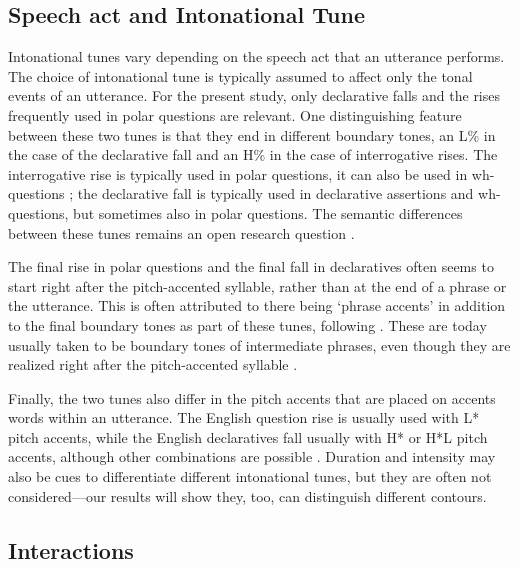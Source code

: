 \documentclass[preprint,review,12pt,authoryear,times]{elsarticle}
\begin{document}
\subsection{Speech act and Intonational Tune}

Intonational tunes vary depending on the speech act that an utterance performs. The choice of intonational tune is typically assumed to affect only the tonal events of an utterance. For the present study, only declarative falls and the rises frequently used in polar questions are relevant. One distinguishing feature between these two tunes is that they end in different boundary tones, an L\% in the case of the declarative fall and an H\% in the case of interrogative rises. The interrogative rise is typically used in polar questions, it can also be used in wh-questions \citep{hedbe14}; the declarative fall is typically used in declarative assertions and wh-questions, but sometimes also in polar questions. The semantic differences between these tunes remains an open research question \citep[see][for a review]{truck12}. 

The final rise in polar questions and the final fall in declaratives often seems to start right after the pitch-accented syllable, rather than at the end of a phrase or the utterance. This is often attributed to there being `phrase accents' in addition to the final boundary tones as part of these tunes, following \citep{pierr80}. These are today usually taken to be boundary tones of intermediate phrases, even though they are realized right after the pitch-accented syllable \citep[see][for a review and empirical evidence in favor of phrase accents]{grice00}. 

Finally, the two tunes also differ in the pitch accents that are placed on accents words within an utterance. The English question rise is usually used with L* pitch accents, while the English declaratives fall usually with H* or H*L pitch accents, although other combinations are possible \citep{pierr90}. Duration and intensity may also be cues to differentiate different intonational tunes, but they are often not considered---our results will show they, too, can distinguish different contours. 


\subsection{Interactions}
\end{document}
